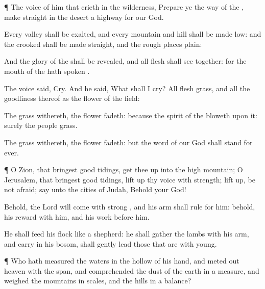 {\par }{\PP {}¶ The
voice of him that
crieth in the
wilderness,
Prepare ye the
way of the
{}, make
straight in the
desert a
highway for our
God.

Every
valley shall be
exalted, and every
mountain and
hill shall be made
low: and the
crooked shall be made
straight, and the rough
places
plain:

And the
glory of the
{} shall be
revealed, and all
flesh shall
see
{}
together: for the
mouth of the
{} hath
spoken
{}.

The
voice
said,
Cry. And he
said, What shall I
cry? All
flesh
{}
grass, and all the
goodliness thereof
{} as the
flower of the
field:

The
grass
withereth, the
flower
fadeth: because the
spirit of the
{}
bloweth upon it:
surely the
people
{}
grass.

The
grass
withereth, the
flower
fadeth: but the
word of our
God shall
stand for
ever.


\par }{\PP {}¶ O
Zion, that bringest good
tidings, get thee
up into the
high
mountain; O
Jerusalem, that bringest good
tidings, lift
up thy
voice with
strength; lift
{}
up, be not
afraid;
say unto the
cities of
Judah, Behold your
God!

Behold, the
Lord
{} will
come with
strong
{}, and his
arm shall
rule for him: behold, his
reward
{} with him, and his
work
before him.

He shall
feed his
flock like a
shepherd: he shall
gather the
lambs with his
arm, and
carry
{} in his
bosom,
{} shall gently
lead those that are with
young.


\par }{\PP {}¶ Who hath
measured the
waters in the hollow of his
hand, and meted
out
heaven with the
span, and
comprehended the
dust of the
earth in a
measure, and
weighed the
mountains in
scales, and the
hills in a
balance?

}
